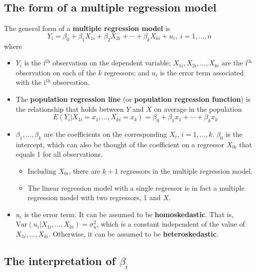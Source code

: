 \documentclass[a4paper,11pt]{article}
\newcommand{\var}{\mathrm{Var}}
\begin{document}
\subsection{The form of a multiple regression model}
\label{sec:org436f0f3}
The general form of a \textbf{multiple regression model} is
\begin{equation}
\label{eq:multi-regress-1}
Y_i = \beta_0 + \beta_1 X_{1i} + \beta_2 X_{2i} + \cdots + \beta_k X_{ki} + u_i,\; i = 1, \ldots, n
\end{equation}
where
\begin{itemize}
\item \(Y_i\) is the i\(^{\text{th}}\) observation on the dependent variable; \(X_{1i},
  X_{2i}, \ldots, X_{ki}\) are the i\(^{\text{th}}\) observation on each of the
\(k\) regressors; and \(u_i\) is the error term associated with the
i\(^{\text{th}}\) observation.
\item The \textbf{population regression line} (or \textbf{population regression
function}) is the relationship that holds between \(Y\) and \(X\) on
average in the population
\begin{equation*}
E(Y_i | X_{1i} = x_{1}, \ldots, X_{ki} = x_k) = \beta_0 + \beta_1 x_1 + \cdots + \beta_k x_k
\end{equation*}
\item \(\beta_1, \ldots, \beta_k\) are the coefficients on the corresponding
\(X_i,\, i = 1, \ldots, k\). \(\beta_0\) is the intercept, which can
also be thought of the coefficient on a regressor \(X_{0i}\) that equals
1 for all observations.
\begin{itemize}
\item Including \(X_{0i}\), there are \(k+1\) regressors in the multiple
regression model.
\item The linear regression model with a single regressor is in fact a
multiple regression model with two regressors, 1 and \(X\).
\end{itemize}
\item \(u_i\) is the error term. It can be assumed to be \textbf{homoskedastic}.
That is, \(\var(u_i | X_{1i}, \ldots, X_{ki}) = \sigma^2_u\), which is
a constant independent of the value of \(X_{1i}, \ldots,
  X_{ki}\). Otherwise, it can be assumed to be \textbf{heteroskedastic}.
\end{itemize}

\subsection{The interpretation of \(\beta_i\)}
\label{sec:org771fdfa}
\end{document}
